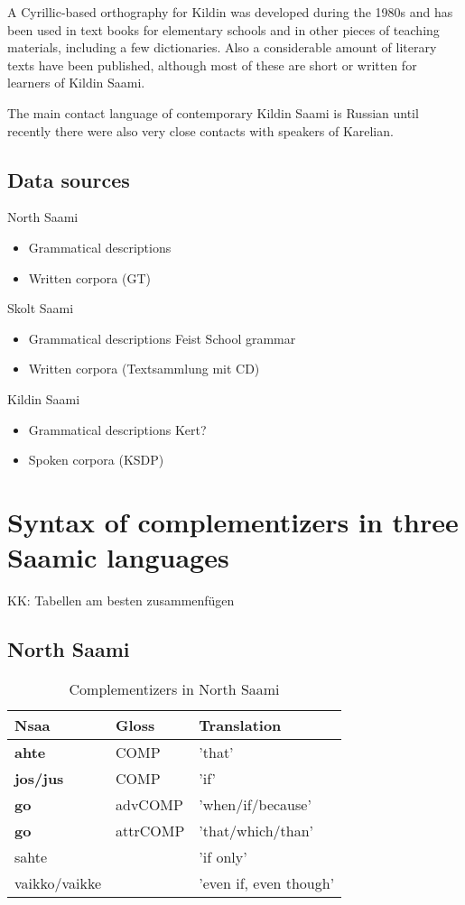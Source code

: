 \documentclass[a4,12pt]{scrartcl}
\begin{document}
A Cyrillic-based orthography for Kildin was developed during the 1980s and has been used in text books for elementary schools and in other pieces of teaching materials, including a few dictionaries. Also a considerable amount of literary texts have been published, although most of these are short or written for learners of Kildin Saami.

The main contact language of contemporary Kildin Saami is Russian until recently there were also very close contacts with speakers of Karelian.

\subsection{Data sources}
North Saami
\begin{itemize}
\item Grammatical descriptions
\item Written corpora (GT)
\end{itemize}

Skolt Saami
\begin{itemize}
\item Grammatical descriptions
	\subitem Feist
	\subitem School grammar
\item Written corpora (Textsammlung mit CD)
\end{itemize}

Kildin Saami
\begin{itemize}
\item Grammatical descriptions
	\subitem Kert?
\item Spoken corpora (KSDP)
\end{itemize}

\section{Syntax of complementizers in three Saamic languages}\label{syntax}
KK: Tabellen am besten zusammenfügen

\subsection{North Saami}
\begin{table}[!ht]
\begin{tabular}{l | l l}
\hline
\hline
Nsaa & Gloss & Translation\\
\hline
{\bf ahte} & {\sc COMP} & 'that'\\
{\bf jos/jus} & {\sc COMP} & 'if'\\
{\bf go} & {\sc advCOMP} & 'when/if/because'\\
{\bf go} & {\sc attrCOMP} & 'that/which/than'\\
sahte & & 'if only'\\
vaikko/vaikke & & 'even if, even though'\\
\hline
\hline
\end{tabular}
\label{KompNSaami}
\caption{Complementizers in North Saami}
\end{table}
\end{document}
